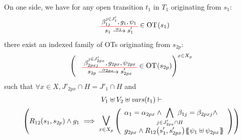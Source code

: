 \documentclass[runningheads]{llncs}
\begin{document}
\begin{enumerate}
On one side, we have for any open transition $t_1$ in $T_1$  originating from $s_1$:
\begin{align*}
\OTx{1}{}{1}{1} \in \fOT{s_1}
\end{align*}
there exist an indexed family of OTs originating from $s_{2p}$: 
\begin{align*}
\mpar{\OTx{2p}{x}{2px}{2px} \in \fOT{s_{2p}}}^{x \in X_p} 
\end{align*}
such that $\forall x \in X, J'_{2px} \cap H = J'_1 \cap H$ and
\begin{multline*}
V_1 \uplus V_2 \uplus \fvars{t_1} \vdash\\ \mpar{R_{12}\mpar{s_1, s_{2p}} \wedge g_1 \implies \operatorname*{\bigsymb{\bigvee}}_{x \in X_p} \mpar{\everymath{\displaystyle}
\begin{array}{l}
			\alpha_1 = \alpha_{2px} \wedge \bigwedge_\subbox{j \in J'_{2px} \cap H} \beta_{1j} = \beta_{2pxj} \nwedge\\
			 g_{2px} \wedge R_{12}\mpar{s'_1, s'_{2px}}\psubst{\psi_1 \uplus \psi_{2px}}
		\end{array}}} 
\end{multline*}		









\end{enumerate}
\end{document}
